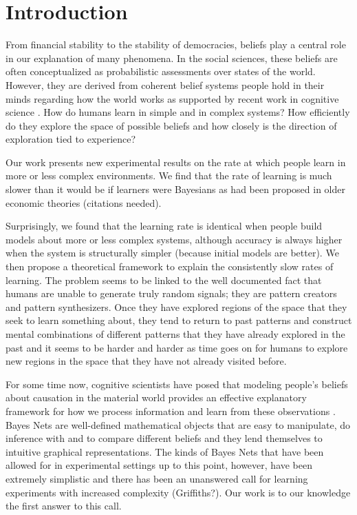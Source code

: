 \section{Introduction}
From financial stability to the stability of democracies, beliefs play a central role in our explanation of many phenomena. In the social sciences, these beliefs are often conceptualized as probabilistic assessments over states of the world.  However, they are derived from coherent belief systems people hold in their minds regarding how the world works as supported by recent work in cognitive science \cite{lombrozo2006structure, anderson1990cognitive}.  How do humans learn in simple and in complex systems?  How efficiently do they explore the space of possible beliefs and how closely is the direction of exploration tied to experience?  

Our work presents new experimental results on the rate at which people learn in more or less complex environments. We find that the rate of learning is much slower than it would be if learners were Bayesians as had been proposed in older economic theories (citations needed).

 Surprisingly, we found that the learning rate is identical when people build models about more or less complex systems, although accuracy is always higher when the system is structurally simpler (because initial models are better). We then propose a theoretical framework to explain the consistently slow rates of learning.  The problem seems to be linked to the well documented fact that humans are unable to generate truly random signals; they are pattern creators and pattern synthesizers.  Once they have explored regions of the space that they seek to learn something about, they tend to return to past patterns and construct mental combinations of different patterns that they have already explored in the past and it seems to be harder and harder as time goes on for humans to explore new regions in the space that they have not already visited before.

For some time now, cognitive scientists have posed that modeling people's beliefs about causation in the material world provides an effective explanatory framework for how we process information and learn from these observations \cite{Griffiths2008}.  Bayes Nets are well-defined mathematical objects that are easy to manipulate, do inference with and to compare different beliefs and they lend themselves to intuitive graphical representations.  The kinds of Bayes Nets that have been allowed for in experimental settings up to this point, however, have been extremely simplistic and there has been an unanswered call for learning experiments with increased complexity (Griffiths?).  Our work is to our knowledge the first answer to this call.  

